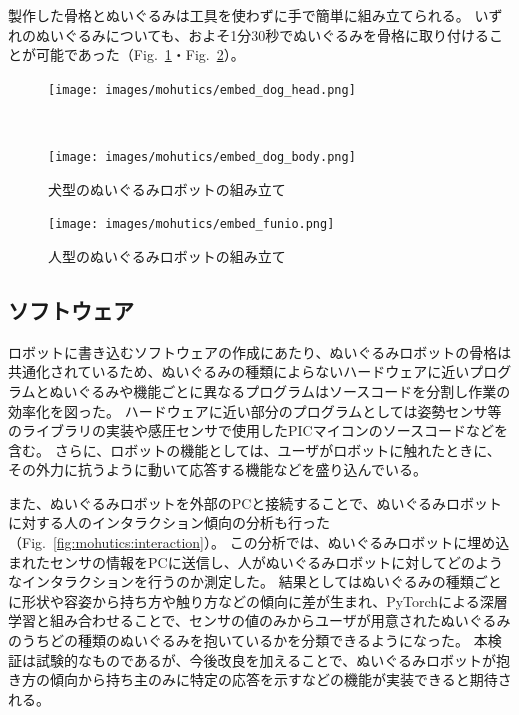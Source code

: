 \documentclass[uplatex,a4paper,12pt]{jsarticle}
\renewcommand{\figurename}{Fig.}
\newcommand{\figref}[1]{\figurename~\ref{#1}}
\begin{document}
製作した骨格とぬいぐるみは工具を使わずに手で簡単に組み立てられる。
いずれのぬいぐるみについても、およそ1分30秒でぬいぐるみを骨格に取り付けることが可能であった（\figref{fig:mohutics:embed_dog}・\figref{fig:mohutics:embed_funio}）。

\begin{figure}[htbp]
  \centering
  \begin{minipage}[c]{\linewidth}
    \centering
    \texttt{[image: images/mohutics/embed\_dog\_head.png]}
  \end{minipage} \\
  \begin{minipage}[c]{\linewidth}
    \centering
    \texttt{[image: images/mohutics/embed\_dog\_body.png]}
  \end{minipage}
  \caption{犬型のぬいぐるみロボットの組み立て}
  \label{fig:mohutics:embed_dog}
\end{figure}

\begin{figure}[htbp]
  \centering
  \texttt{[image: images/mohutics/embed\_funio.png]}
  \caption{人型のぬいぐるみロボットの組み立て}
  \label{fig:mohutics:embed_funio}
\end{figure}

\subsection{ソフトウェア}
ロボットに書き込むソフトウェアの作成にあたり、ぬいぐるみロボットの骨格は共通化されているため、ぬいぐるみの種類によらないハードウェアに近いプログラムとぬいぐるみや機能ごとに異なるプログラムはソースコードを分割し作業の効率化を図った。
ハードウェアに近い部分のプログラムとしては姿勢センサ等のライブラリの実装や感圧センサで使用したPICマイコンのソースコードなどを含む。
さらに、ロボットの機能としては、ユーザがロボットに触れたときに、その外力に抗うように動いて応答する機能などを盛り込んでいる。

また、ぬいぐるみロボットを外部のPCと接続することで、ぬいぐるみロボットに対する人のインタラクション傾向の分析も行った（\figref{fig:mohutics:interaction}）。
この分析では、ぬいぐるみロボットに埋め込まれたセンサの情報をPCに送信し、人がぬいぐるみロボットに対してどのようなインタラクションを行うのか測定した。
結果としてはぬいぐるみの種類ごとに形状や容姿から持ち方や触り方などの傾向に差が生まれ、PyTorchによる深層学習と組み合わせることで、センサの値のみからユーザが用意されたぬいぐるみのうちどの種類のぬいぐるみを抱いているかを分類できるようになった。
本検証は試験的なものであるが、今後改良を加えることで、ぬいぐるみロボットが抱き方の傾向から持ち主のみに特定の応答を示すなどの機能が実装できると期待される。
\end{document}
